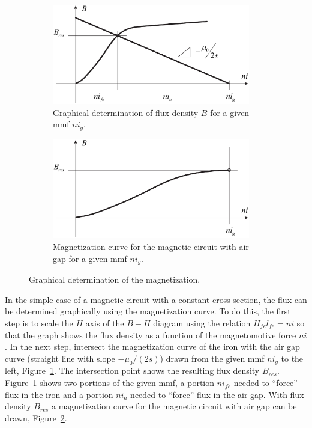 \documentclass[11pt,a4paper,oneside]{book}
\numberwithin{equation}{section}
\theoremstyle{it}
\theoremstyle{definition}
\begin{document}
\begin{figure}[H]
	\centering
	\begin{subfigure}{0.5\textwidth}
		\centering
		\includegraphics[width = 245pt, angle = 0, 
		keepaspectratio]{figures/magnetic_bearing/magnetization_1.eps}
		\captionsetup{width=0.65\textwidth, font=footnotesize}	
		\caption{Graphical determination of flux density $B$ for a given mmf $ni_g$.}
		\label{magnetization_1}
	\end{subfigure}%
	\begin{subfigure}{0.5\textwidth}
		\centering
		\includegraphics[width = 245pt, angle = 0, 
		keepaspectratio]{figures/magnetic_bearing/magnetization_3.eps}
		\captionsetup{width=0.7\textwidth, font=footnotesize}	
		\caption{Magnetization curve for the magnetic circuit with air gap for a given mmf $ni_g$.}
		\label{magnetization_2}
	\end{subfigure}
	\captionsetup{width=0.5\textwidth, font=small}	
	\caption{Graphical determination of the magnetization.}
	\label{}
\end{figure}
In the simple case of a magnetic circuit with a constant cross section, the flux can be determined graphically using the magnetization curve. To do this, the first step is to scale the $H$ axis of the $B-H$ diagram using the relation $H_{fe}l_{fe} = ni$ so that the graph shows the flux density as a function of the magnetomotive force $ni$. In the next step, intersect the magnetization curve of the iron with the air gap curve (straight line with slope $-\mu_0/(2s)$) drawn from the given mmf $ni_g$ to the left, Figure~\ref{magnetization_1}. The intersection point shows the resulting flux density  $B_{res}$.  Figure~\ref{magnetization_1} shows two portions of the given mmf, a portion $ni_{fe}$ needed to ``force'' flux in the iron and a portion $ni_a$ needed to ``force'' flux in the air gap. With flux density $B_{res}$ a magnetization curve for the magnetic circuit with air gap can be drawn, Figure~\ref{magnetization_2}.
\end{document}
